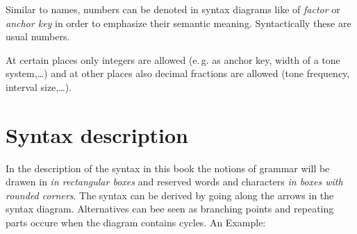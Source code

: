 \iffalse
Zahlen können ganzzahlig oder mit Dezimalpunkt geschrieben werden.
Eine Schreibweise mit Zehnerexponent ist nicht
zugelassen.\index{Zahlen} Ferner kann eine Zahl auch mit dem Zeichen
{\bf \#}\index{*#@\#} beginnen und weitere Hex-Ziffern\index{Hex-Ziffern}
enthalten. Diese Schreibweise bedeutet, daß die Zahl zur Basis 16
ausgewertet wird. In dieser Hex-Schreibweise ist kein Dezimalpunkt
erlaubt, folglich sind nur ganzzahlige Werte darstellbar.
\fi

Similar to names, numbers can be denoted in syntax diagrams like
of \textit{factor} or \textit{anchor key} in order to emphasize their
semantic meaning. Syntactically these are usual numbers.
\iffalse
Ähnlich wie bei Namen werden Zahlen im Syntaxdiagramm auch als {\it Faktor}
oder {\it Verankerungs-Taste} bezeichnet,
um ihre jeweilige semantische Bedeutung
hervorzuheben. Es handelt sich aber syntaktisch gesehen um ganz gewöhnliche
Zahlen.
\fi

At certain places only integers are allowed (e.\,g. as anchor key,
width of a tone system,\ldots) and at other places also decimal
fractions are allowed (tone frequency, interval size,\ldots).
\iffalse
An einigen Stellen sind nur ganze Zahlen zugelassen (z.\,B. als
Verankerungs-Taste, Tonsystem-Breite,\ldots) und an anderen Stellen
sind auch Komma-Zahlen zugelassen, (Tonfrequenz,
In\-ter\-vall\-gr"o"se,\ldots).
\fi


\chapter{Syntax description}\label{cha:syntax-schreibweise}
\label{drei}

In the description of the syntax in this book the notions of grammar
will be drawen in \emph{in rectangular boxes} and reserved words and
characters \emph{in boxes with rounded corners}. The syntax can be
derived by going along the arrows in the syntax diagram. Alternatives
can bee seen as branching points and repeating parts occure when the
diagram contains cycles. An Example:
\iffalse
In der Syntax-Darstellung in diesem Buch werden die Grammatikbegriffe
{\it in eckigen Kästchen} und reservierte Worte und Zeichen {\it in
ovalen Kästchen} geschrieben. Die Syntax erhält man, indem man auf den
Pfeilen entlang durch das Syntaxdiagramm läuft.
Alternative Formulierungen erscheinen dabei als Verzweigungen
und Wiederholungen ergeben sich, indem das Syntaxdiagramm Zyklen enthält.
Ein Beispiel:
\fi

